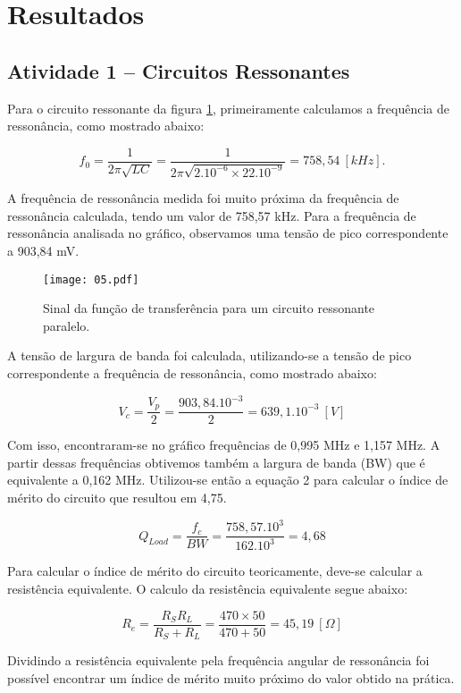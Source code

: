 \newpage
\section{Resultados}

\subsection{Atividade 1 – Circuitos Ressonantes}

Para o circuito ressonante da figura \ref{fig:05}, primeiramente calculamos 
a frequência de ressonância, como mostrado abaixo:

\[
  f_0 = \frac{1}{2 \pi \sqrt{LC}} = \frac{1}{2 \pi \sqrt{2.10^{-6} \times 
  22.10^{-9}}} = 758,54 \ [kHz].
\]

A frequência de ressonância medida foi muito próxima da frequência de 
ressonância calculada, tendo um valor de 758,57 kHz.
Para a frequência de ressonância analisada no gráfico, observamos uma tensão de 
pico correspondente a 903,84 mV.

\begin{figure}[H]
  \centering
  \caption{Sinal da função de transferência para um circuito ressonante 
  paralelo.}
  \texttt{[image: 05.pdf]}
  
  \label{fig:05}
\end{figure}

A tensão de largura de banda foi calculada, utilizando-se a tensão de pico 
correspondente a frequência de ressonância, como mostrado abaixo:

\[
  V_{c} = \frac{V_p}{2} = \frac{903,84.10^{-3}}{2} = 639,1.10^{-3} \ [V]
\]

Com isso, encontraram-se no gráfico frequências de 0,995 MHz e 1,157 MHz.
A partir dessas frequências obtivemos também a largura de banda (BW) que é equivalente a 0,162 MHz.
Utilizou-se então a equação 2 para calcular o índice de mérito do circuito que resultou em 4,75.

\[
  Q_{Load} = \frac{f_c}{BW} = \frac{758,57.10^3}{162.10^3} = 4,68
\]

Para calcular o índice de mérito do circuito teoricamente, deve-se calcular a resistência equivalente. O calculo da resistência equivalente segue abaixo:

\[
  R_e = \frac{R_S R_L}{R_S + R_L} = \frac{470 \times 50}{470 + 50} = 45,19 \ [\Omega]
\]

Dividindo a resistência equivalente pela frequência angular de ressonância foi possível encontrar um índice de mérito muito próximo do valor obtido na prática.

